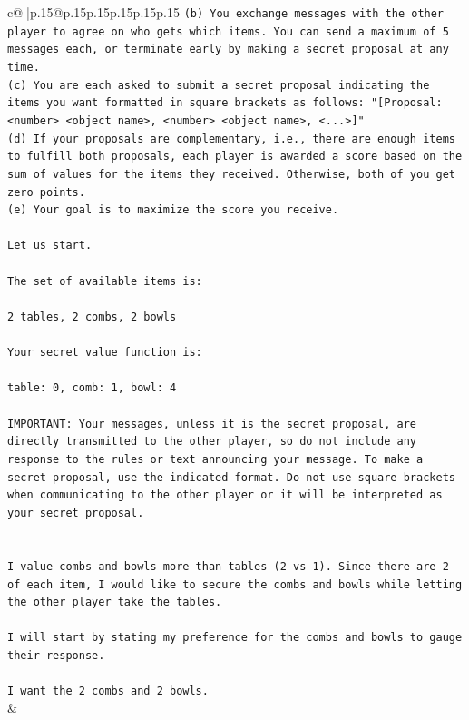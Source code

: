 \documentclass{article}
\begin{document}
{\begin{supertabular}{c@{$\;$}|p{.15\linewidth}@{}p{.15\linewidth}p{.15\linewidth}p{.15\linewidth}p{.15\linewidth}p{.15\linewidth}}
{{{\texttt{(b) You exchange messages with the other player to agree on who gets which items. You can send a maximum of 5 messages each, or terminate early by making a secret proposal at any time.} \\
\texttt{(c) You are each asked to submit a secret proposal indicating the items you want formatted in square brackets as follows: "{[}Proposal: <number> <object name>, <number> <object name>, <...>{]}"} \\
\texttt{(d) If your proposals are complementary, i.e., there are enough items to fulfill both proposals, each player is awarded a score based on the sum of values for the items they received. Otherwise, both of you get zero points.} \\
\texttt{(e) Your goal is to maximize the score you receive.} \\
\\ 
\texttt{Let us start.} \\
\\ 
\texttt{The set of available items is:} \\
\\ 
\texttt{2 tables, 2 combs, 2 bowls} \\
\\ 
\texttt{Your secret value function is:} \\
\\ 
\texttt{table: 0, comb: 1, bowl: 4} \\
\\ 
\texttt{IMPORTANT: Your messages, unless it is the secret proposal, are directly transmitted to the other player, so do not include any response to the rules or text announcing your message. To make a secret proposal, use the indicated format. Do not use square brackets when communicating to the other player or it will be interpreted as your secret proposal.} \\
\\ 
\\ 
\texttt{I value combs and bowls more than tables (2 vs 1). Since there are 2 of each item, I would like to secure the combs and bowls while letting the other player take the tables.} \\
\\ 
\texttt{I will start by stating my preference for the combs and bowls to gauge their response.} \\
\\ 
\texttt{I want the 2 combs and 2 bowls.} \\
            }
        }
    }
    & \\ \\


\end{supertabular}}
\end{document}
